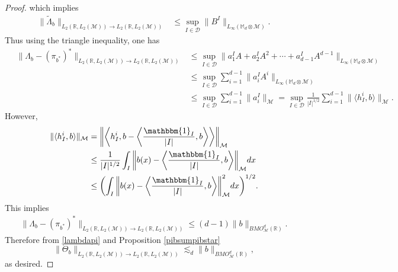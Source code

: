 \documentclass[oneside,english,a4wide]{amsart}
\numberwithin{equation}{section}
\numberwithin{figure}{section}
\theoremstyle{plain}
\theoremstyle{plain}
\theoremstyle{definition}
\theoremstyle{plain}
\theoremstyle{remark}
\theoremstyle{definition}
\theoremstyle{remark}
\theoremstyle{definition}
\newcommand{\8}{\infty}
\begin{document}
\begin{proof}
which implies
\begin{equation*}
	\begin{aligned}
		\|\tilde{\varLambda}_b\|_{L_2(\mathbb{R},L_2(\mathcal{M}))\to L_2(\mathbb{R},L_2(\mathcal{M}))}{}&\le \sup_{I\in\mathcal{D}}\|B^I\|_{L_\infty(\mathbb{M}_{d}\otimes \mathcal{M})}.
	\end{aligned}
\end{equation*}
Thus using the triangle inequality, one has
	\begin{equation}\label{bbbbbbb}
		\begin{aligned}
			\quad\|\varLambda_b-(\pi_{b^*})^*\|_{L_2(\mathbb{R},L_2(\mathcal{M}))\to L_2(\mathbb{R},L_2(\mathcal{M}))}{}&\le \sup_{I\in\mathcal{D}}\|a_1^IA+a_2^IA^2+\cdots+a_{d-1}^IA^{d-1}\|_{L_\infty(\mathbb{M}_{d}\otimes \mathcal{M})}\\
			&\le\sup_{I\in\mathcal{D}}\sum_{i=1}^{d-1}\|a_i^IA^i\|_{L_\infty(\mathbb{M}_{d}\otimes \mathcal{M})}\\
			&\le\sup_{I\in\mathcal{D}}\sum_{i=1}^{d-1}\|a_i^I\|_{\mathcal{M}}
			=\sup_{I\in \mathcal{D}}\frac{1}{|I|^{1/2}}\sum_{i=1}^{d-1}\|\langle h_I^i,b\rangle\|_\mathcal{M}.
		\end{aligned}
	\end{equation}
	However,
	\begin{equation*}
		\begin{aligned}
			\|\langle h_I^i,b\rangle\|_\mathcal{M}{}&=\bigg\|\biggl\langle h_I^i, b-\bigg\langle \frac{\mathbbm{1}_I}{|I|},b \bigg\rangle \biggl\rangle\bigg\|_{\mathcal{M}}\\
			&\le \frac{1}{|I|^{1/2}}\int_I \bigg\| b(x)-\bigg\langle \frac{\mathbbm{1}_I}{|I|},b \bigg\rangle \bigg\|_{\mathcal{M}}dx\\
			&\le \biggl(\int_I \bigg\| b(x)-\bigg\langle \frac{\mathbbm{1}_I}{|I|},b \bigg\rangle \bigg\|^2_{\mathcal{M}}dx\biggr)^{1/2}.
		\end{aligned}
	\end{equation*}
	This implies
	\begin{equation}\label{lambdapi}
		\begin{aligned}
			\|\varLambda_b-(\pi_{b^*})^*\|_{L_2(\mathbb{R},L_2(\mathcal{M}))\to L_2(\mathbb{R},L_2(\mathcal{M}))}\le (d-1)\|b\|_{BMO^d_\mathcal{M}(\mathbb{R})}.
		\end{aligned}
	\end{equation}
	Therefore from \eqref{lambdapi} and Proposition \ref{pibsumpibstar}
	\begin{equation*}
		\|\Theta_b\|_{L_2(\mathbb{R},L_2(\mathcal{M}))\to L_2(\mathbb{R},L_2(\mathcal{M}))}\lesssim_d \|b\|_{BMO^d_\mathcal{M}(\mathbb{R})},
	\end{equation*}
	as desired.
\end{proof}
\end{document}

